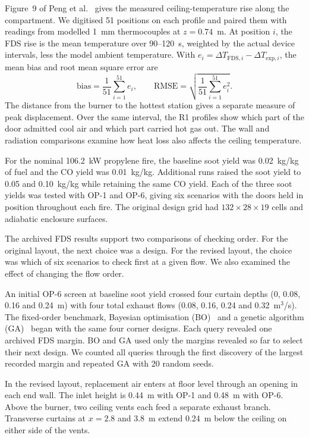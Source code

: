 Figure~9 of Peng et al.~\cite{peng} gives the measured ceiling-temperature rise along the compartment. We digitised 51 positions on each profile and paired them with readings from modelled 1~mm thermocouples at $z=0.74$~m. At position $i$, the FDS rise is the mean temperature over 90--120~s, weighted by the actual device intervals, less the model ambient temperature. With $e_i=\Delta T_{\mathrm{FDS},i}-\Delta T_{\mathrm{exp},i}$, the mean bias and root mean square error are
\[
 \mathrm{bias}=\frac{1}{51}\sum_{i=1}^{51}e_i,\qquad
 \mathrm{RMSE}=\sqrt{\frac{1}{51}\sum_{i=1}^{51}e_i^2}.
\]
The distance from the burner to the hottest station gives a separate measure of peak displacement. Over the same interval, the R1 profiles show which part of the door admitted cool air and which part carried hot gas out. The wall and radiation comparisons examine how heat loss also affects the ceiling temperature.



\clearpage
{}
For the nominal 106.2~kW propylene fire, the baseline soot yield was 0.02~kg/kg of fuel and the CO yield was 0.01~kg/kg. Additional runs raised the soot yield to 0.05 and 0.10~kg/kg while retaining the same CO yield. Each of the three soot yields was tested with OP-1 and OP-6, giving six scenarios with the doors held in position throughout each fire. The original design grid had $132\times28\times19$ cells and adiabatic enclosure surfaces.

The archived FDS results support two comparisons of checking order. For the original layout, the next choice was a design. For the revised layout, the choice was which of six scenarios to check first at a given flow. We also examined the effect of changing the flow order.

An initial OP-6 screen at baseline soot yield crossed four curtain depths (0, 0.08, 0.16 and 0.24~m) with four total exhaust flows (0.08, 0.16, 0.24 and 0.32~m$^3$/s). The fixed-order benchmark, Bayesian optimisation (BO)~\cite{bo} and a genetic algorithm (GA)~\cite{ga} began with the same four corner designs. Each query revealed one archived FDS margin. BO and GA used only the margins revealed so far to select their next design. We counted all queries through the first discovery of the largest recorded margin and repeated GA with 20 random seeds.

In the revised layout, replacement air enters at floor level through an opening in each end wall. The inlet height is 0.44~m with OP-1 and 0.48~m with OP-6. Above the burner, two ceiling vents each feed a separate exhaust branch. Transverse curtains at $x=2.8$ and 3.8~m extend 0.24~m below the ceiling on either side of the vents.

